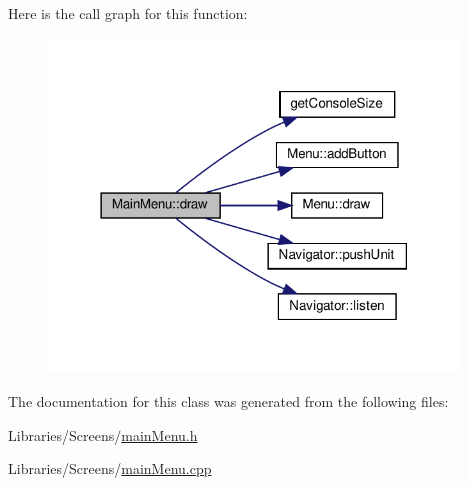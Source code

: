 Here is the call graph for this function\+:
\nopagebreak
\begin{figure}[H]
\begin{center}
\leavevmode
\includegraphics[width=309pt]{class_main_menu_a6c17addf154519404a791d3c2a40a2aa_cgraph}
\end{center}
\end{figure}


The documentation for this class was generated from the following files\+:\begin{DoxyCompactItemize}
\item 
Libraries/\+Screens/\mbox{\hyperlink{main_menu_8h}{main\+Menu.\+h}}\item 
Libraries/\+Screens/\mbox{\hyperlink{main_menu_8cpp}{main\+Menu.\+cpp}}\end{DoxyCompactItemize}
